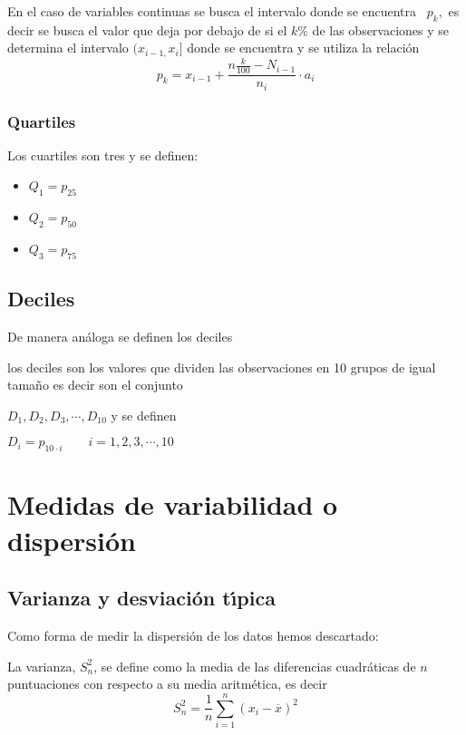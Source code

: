 En el caso de variables continuas se busca el intervalo donde se encuentra
\ $p_{k},$ es decir se busca el valor que deja por debajo de si el $k\%$ de
las observaciones y se determina el intervalo $(x_{i-1,}x_{i}]$ donde se
encuentra y se utiliza la relaci\'{o}n
\[
p_{k}=x_{i-1}+\frac{n\frac{k}{100}-N_{i-1}}{n_{i}}\cdot a_{i}%
\]

\subsubsection{Quartiles}

Los cuartiles son tres y se definen:

\begin{itemize}
\item $Q_{1}=p_{25}$

\item $Q_{2}=p_{50}$

\item $Q_{3}=p_{75}$
\end{itemize}

\subsection{Deciles}

De manera an\'{a}loga se definen los deciles

los deciles son los valores que dividen las observaciones en 10 grupos de
igual tama\~{n}o es decir son el conjunto

$D_{1},D_{2},D_{3},\cdots,D_{10}$ y se definen

$D_{i}=p_{10\cdot i}\qquad i=1,2,3,\cdots,10$

\section{Medidas de variabilidad o dispersi\'{o}n}

\subsection{Varianza y desviaci\'{o}n t\'{\i}pica}

Como forma de medir la dispersi\'{o}n de los datos hemos descartado:

La varianza, $S_{n}^{2}$, se define como la media de las diferencias
cuadr\'{a}ticas de $n$ puntuaciones con respecto a su media aritm\'{e}tica, es
decir
\[
S_{n}^{2}=\frac{1}{n}\sum_{i=1}^{n}\left(  x_{i}-\overline{x}\right)  ^{2}%
\]

